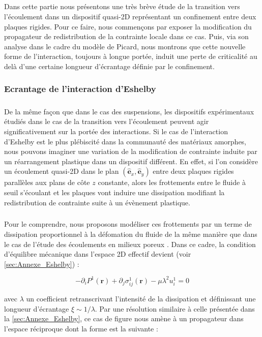 \label{sec:lambda_picard}

\subparagraph{}Dans cette partie nous présentons une très brève étude de la transition vers l'écoulement dans un dispositif quasi-2D représentant un confinement entre deux plaques rigides. Pour ce faire, nous commençons par exposer la modification du propagateur de redistribution de la contrainte locale dans ce cas. Puis, via son analyse dans le cadre du modèle de Picard, nous montrons que cette nouvelle forme de l'interaction, toujours à longue portée, induit une perte de criticalité au delà d'une certaine longueur d'écrantage définie par le confinement.

\subsubsection{Ecrantage de l'interaction d'Eshelby}

\subparagraph{}De la même façon que dans le cas des suspensions, les dispositifs expérimentaux étudiés dans le cas de la transition vers l'écoulement peuvent agir significativement sur la portée des interactions. Si le cas de l'interaction d'Eshelby est le plus plébiscité dans la communauté des matériaux amorphes, nous pouvons imaginer une variation de la modification de contrainte induite par un réarrangement plastique dans un dispositif différent. En effet, si l'on considère un écoulement quasi-2D dans le plan $(\hat{\mathbf{e}}_x, \hat{\mathbf{e}}_y)$ entre deux plaques rigides parallèles aux plans de côte $z$ constante, alors les frottements entre le fluide à seuil s'écoulant et les plaques vont induire une dissipation modifiant la redistribution de contrainte suite à un évènement plastique. 

\subparagraph{}Pour le comprendre, nous proposons modéliser ces frottements par un terme de dissipation proportionnel à la défomation du fluide de la même manière que dans le cas de l'étude des écoulements en milieux poreux \cite{long_note_2001}. Dans ce cadre, la condition d'équilibre mécanique dans l'espace 2D effectif devient (voir \autoref{sec:Annexe_Eshelby}) :

\begin{equation}
	-\partial_i P^1(\mathbf{r}) + \partial_j\sigma_{ij}^1(\mathbf{r}) - \mu\lambda^2 u^1_{i}= 0
\end{equation}

\noindent avec $\lambda$ un coefficient retranscrivant l'intensité de la dissipation et définissant une longueur d'écrantage $\xi \sim 1/\lambda$. Par une résolution similaire à celle présentée dans la \autoref{sec:Annexe_Eshelby}, ce cas de figure nous amène à un propagateur dans l'espace réciproque dont la forme est la suivante :

